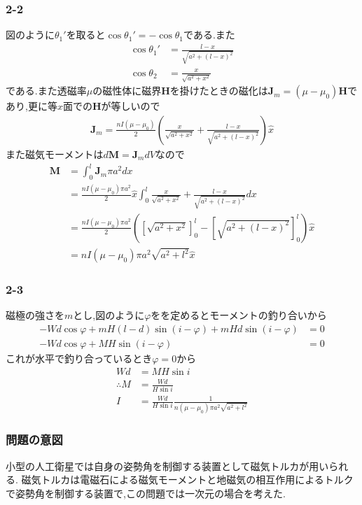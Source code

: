 \subsubsection*{2-2}
図のように$\theta_1'$を取ると$\cos\theta_1'=-\cos\theta_1$である.また
\begin{align*}
  \cos\theta_1' & =\frac{l-x}{\sqrt{a^2+(l-x)^2}} \\
  \cos\theta_2  & =\frac{x}{\sqrt{a^2+x^2}}
\end{align*}
である.また透磁率$\mu$の磁性体に磁界${\bm H}$を掛けたときの磁化は${\bm J}_m=(\mu-\mu_0){\bm H}$であり,更に等$x$面での${\bm H}$が等しいので
\begin{align*}
  {\bm J}_m=\frac{nI(\mu-\mu_0)}{2}\left(\frac{x}{\sqrt{a^2+x^2}}+\frac{l-x}{\sqrt{a^2+(l-x)^2}}\right)\hat{x}
\end{align*}
また磁気モーメントは$d{\bm M}={\bm J}_mdV$なので
\begin{align*}
  {\bm M} & =\int_0^l{\bm J}_m\pi a^2dx                                                                                            \\
          & =\frac{nI(\mu-\mu_0)\pi a^2}{2}\hat{x}\int_0^l\frac{x}{\sqrt{a^2+x^2}}+\frac{l-x}{\sqrt{a^2+(l-x)^2}}dx                \\
          & =\frac{nI(\mu-\mu_0)\pi a^2}{2}\left(\left[\sqrt{a^2+x^2}\right]_0^l-\left[\sqrt{a^2+(l-x)^2}\right]_0^l\right)\hat{x} \\
          & =nI(\mu-\mu_0)\pi a^2\sqrt{a^2+l^2}\hat{x}
\end{align*}
\subsubsection*{2-3}
磁極の強さを$m$とし,図のように$\varphi$をを定めるとモーメントの釣り合いから
\begin{align*}
  -Wd\cos\varphi+mH(l-d)\sin(i-\varphi)+mHd\sin(i-\varphi) & =0 \\
  -Wd\cos\varphi+MH\sin(i-\varphi)                         & =0
\end{align*}
これが水平で釣り合っているとき$\varphi=0$から
\begin{align*}
  Wd           & =MH\sin i                                                      \\
  \therefore M & =\frac{Wd}{H\sin i}                                            \\
  I            & =\frac{Wd}{H\sin i}\frac{1}{n(\mu-\mu_0)\pi a^2\sqrt{a^2+l^2}}
\end{align*}
\subsubsection*{問題の意図}
小型の人工衛星では自身の姿勢角を制御する装置として磁気トルカが用いられる.
磁気トルカは電磁石による磁気モーメントと地磁気の相互作用によるトルクで姿勢角を制御する装置で,この問題では一次元の場合を考えた.